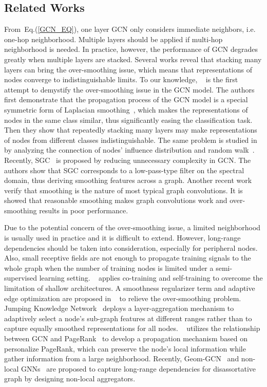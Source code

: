\documentclass[sigconf]{acmart}
\begin{document}
\subsection{Related Works}
From~Eq.(\ref{GCN_EQ}), one layer GCN only considers immediate
neighbors, i.e. one-hop neighborhood. Multiple layers should be
applied if multi-hop neighborhood is needed. In practice,
however, the performance of GCN degrades greatly when multiple
layers are stacked. Several works reveal that stacking many
layers can bring the over-smoothing issue, which means that
representations of nodes converge to indistinguishable limits. To
our knowledge, ~\cite{li2018deeper} is the first attempt to
demystify the over-smoothing issue in the GCN model. The authors
first demonstrate that the propagation process of the GCN model
is a special symmetric form of Laplacian
smoothing~\cite{taubin1995signal}, which makes the
representations of nodes in the same class similar, thus
significantly easing the classification task. Then they show that
repeatedly stacking many layers may make representations of nodes
from different classes indistinguishable. The same problem is
studied in~\cite{xu2018representation} by analyzing the
connection of nodes' influence distribution and random
walk~\cite{lovasz1993random}. Recently,
SGC~\cite{wu2019simplifying} is proposed by reducing unnecessary
complexity in GCN. The authors show that SGC corresponds to a
low-pass-type filter on the spectral domain, thus deriving
smoothing features across a graph. Another recent
work~\cite{chen2019measuring} verify that smoothing is the nature
of most typical graph convolutions. It is showed that reasonable
smoothing makes graph convolutions work and over-smoothing
results in poor performance.

Due to the potential concern of the over-smoothing issue, a
limited neighborhood is usually used in practice and it is
difficult to extend. However, long-range dependencies should be
taken into consideration, especially for peripheral nodes. Also,
small receptive fields are not enough to propagate training
signals to the whole graph when the number of training nodes is
limited under a semi-supervised learning setting.
~\cite{li2018deeper} applies co-training and self-training to
overcome the limitation of shallow architectures. A smoothness
regularizer term and adaptive edge optimization are proposed in
~\cite{chen2019measuring} to relieve the over-smoothing problem.
Jumping Knowledge Network~\cite{xu2018representation} deploys a
layer-aggregation mechanism to adaptively select a node’s
sub-graph features at different ranges rather than to capture
equally smoothed representations for all nodes.
~\cite{klicpera2018predict} utilizes the relationship between GCN
and PageRank~\cite{page1999pagerank} to develop a propagation
mechanism based on personalize PageRank, which can preserve the
node's local information while gather information from a large
neighborhood. Recently, Geom-GCN~\cite{pei2020geom} and non-local
GNNs~\cite{liu2020non} are proposed to capture long-range
dependencies for disassortative graph by designing non-local
aggregators.
\end{document}
